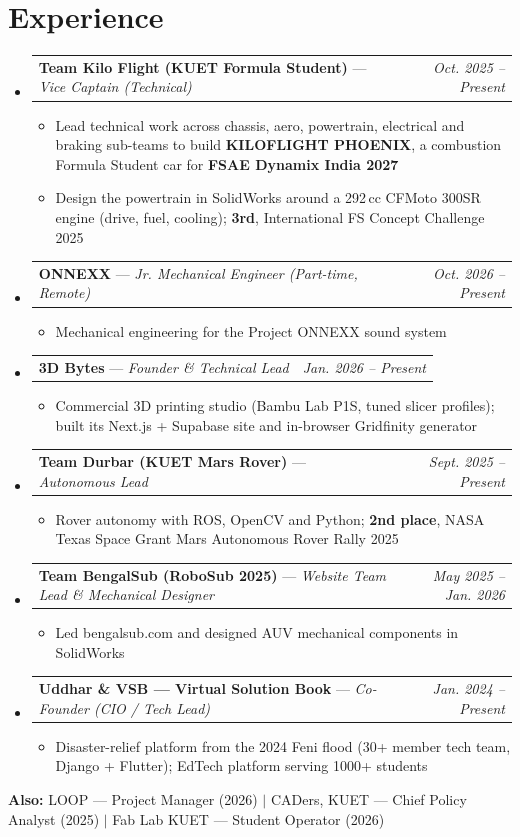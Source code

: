 \documentclass[letterpaper,10pt]{article}
\makeatletter
\newcommand{\resumeItem}[1]{\item\small{#1}}
\newcommand{\resumeSubheading}[4]{
  \vspace{-3pt}\item
    \begin{tabular*}{0.98\textwidth}[t]{l@{\extracolsep{\fill}}r}
      \textbf{#1} \small{--- \textit{#3}} & \textit{\small #4} \\
    \end{tabular*}\vspace{-2pt}
}
\newcommand{\resumeSubHeadingListStart}{\begin{itemize}[leftmargin=0.1in, label={}]}
\newcommand{\resumeSubHeadingListEnd}{\end{itemize}\vspace{-2pt}}
\newcommand{\resumeItemListStart}{\begin{itemize}[label=$\bullet$, leftmargin=0.18in, topsep=1pt, itemsep=0pt, parsep=0pt]}
\newcommand{\resumeItemListEnd}{\end{itemize}\vspace{-1pt}}
\makeatother
\begin{document}
\section{Experience}
  \resumeSubHeadingListStart
    \resumeSubheading{Team Kilo Flight (KUET Formula Student)}{}{Vice Captain (Technical)}{Oct. 2025 -- Present}
      \resumeItemListStart
        \resumeItem{Lead technical work across chassis, aero, powertrain, electrical and braking sub-teams to build \textbf{KILOFLIGHT PHOENIX}, a combustion Formula Student car for \textbf{FSAE Dynamix India 2027}}
        \resumeItem{Design the powertrain in SolidWorks around a 292\,cc CFMoto 300SR engine (drive, fuel, cooling); \textbf{3rd}, International FS Concept Challenge 2025}
      \resumeItemListEnd
    \resumeSubheading{ONNEXX}{}{Jr. Mechanical Engineer (Part-time, Remote)}{Oct. 2026 -- Present}
      \resumeItemListStart
        \resumeItem{Mechanical engineering for the Project ONNEXX sound system}
      \resumeItemListEnd
    \resumeSubheading{3D Bytes}{}{Founder \& Technical Lead}{Jan. 2026 -- Present}
      \resumeItemListStart
        \resumeItem{Commercial 3D printing studio (Bambu Lab P1S, tuned slicer profiles); built its Next.js + Supabase site and in-browser Gridfinity generator}
      \resumeItemListEnd
    \resumeSubheading{Team Durbar (KUET Mars Rover)}{}{Autonomous Lead}{Sept. 2025 -- Present}
      \resumeItemListStart
        \resumeItem{Rover autonomy with ROS, OpenCV and Python; \textbf{2nd place}, NASA Texas Space Grant Mars Autonomous Rover Rally 2025}
      \resumeItemListEnd
    \resumeSubheading{Team BengalSub (RoboSub 2025)}{}{Website Team Lead \& Mechanical Designer}{May 2025 -- Jan. 2026}
      \resumeItemListStart
        \resumeItem{Led bengalsub.com and designed AUV mechanical components in SolidWorks}
      \resumeItemListEnd
    \resumeSubheading{Uddhar \& VSB --- Virtual Solution Book}{}{Co-Founder (CIO / Tech Lead)}{Jan. 2024 -- Present}
      \resumeItemListStart
        \resumeItem{Disaster-relief platform from the 2024 Feni flood (30+ member tech team, Django + Flutter); EdTech platform serving 1000+ students}
      \resumeItemListEnd
  \resumeSubHeadingListEnd
  \vspace{-1pt}
  \small{\hspace{0.1in}\textbf{Also:} LOOP --- Project Manager (2026) $|$ CADers, KUET --- Chief Policy Analyst (2025) $|$ Fab Lab KUET --- Student Operator (2026)}

\end{document}
